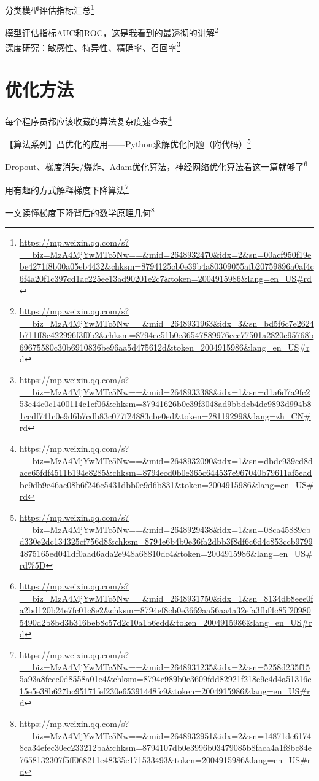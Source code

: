 \documentclass[]{ctexbook}
\renewcommand{\href}[2]{#2\footnote{\url{#1}}}
\begin{document}
\href{https://mp.weixin.qq.com/s?__biz=MzA4MjYwMTc5Nw==\&mid=2648932470\&idx=2\&sn=00acf950f19ebe4271f8b00a05eb4432\&chksm=8794125cb0e39b4a80309055afb20759896a0af4c6f4a20f1c397cd1ac225ee13ad90201e2c7\&token=2004915986\&lang=en_US\#rd}{分类模型评估指标汇总}

\href{https://mp.weixin.qq.com/s?__biz=MzA4MjYwMTc5Nw==\&mid=2648931963\&idx=3\&sn=bd5f6c7e2624b711ff8c422996f3f0b2\&chksm=8794ec51b0e36547889976ccc77501a2820c95768b69675580c30b6910836be96aa5d475612d\&token=2004915986\&lang=en_US\#rd}{模型评估指标AUC和ROC，这是我看到的最透彻的讲解}\\
\href{https://mp.weixin.qq.com/s?__biz=MzA4MjYwMTc5Nw==\&mid=2648933388\&idx=1\&sn=d1a6d7a9fc253e44c0c1400114c1cf06\&chksm=87941626b0e39f3048ad9bbdcb4dc9893d994b81ccdf741c0e9d6b7cdb83c077f24883cbe0ed\&token=281192998\&lang=zh_CN\#rd}{深度研究：敏感性、特异性、精确率、召回率}

\hypertarget{ux4f18ux5316ux65b9ux6cd5}{%
\section{优化方法}\label{ux4f18ux5316ux65b9ux6cd5}}

\href{https://mp.weixin.qq.com/s?__biz=MzA4MjYwMTc5Nw==\&mid=2648932090\&idx=1\&sn=dbdc939cd8dace65fdf4511b194e8285\&chksm=8794ecd0b0e365c644537e967040b79611af5eadbc9db9e46ac08b6f246c5431dbb0e9d6b831\&token=2004915986\&lang=en_US\#rd}{每个程序员都应该收藏的算法复杂度速查表}

\href{https://mp.weixin.qq.com/s?__biz=MzA4MjYwMTc5Nw==\&mid=2648929438\&idx=1\&sn=08ca45889cbd330e2dc134325cf756d8\&chksm=8794e6b4b0e36fa2dbb3f8df6c6d4c853ccb97994875165ed041df0aad6ada2e948a68810dc4\&token=2004915986\&lang=en_US\#rd\%5D}{【算法系列】凸优化的应用------Python求解优化问题（附代码）}

\href{https://mp.weixin.qq.com/s?__biz=MzA4MjYwMTc5Nw==\&mid=2648931750\&idx=1\&sn=8134db8eee0fa2bd120b24e7fc01c8e2\&chksm=8794ef8cb0e3669aa56aa4a32efa3fbf4c85f209805490d2b8bd3b316beb8c57d2c10a1b6edd\&token=2004915986\&lang=en_US\#rd}{Dropout、梯度消失/爆炸、Adam优化算法，神经网络优化算法看这一篇就够了}

\href{https://mp.weixin.qq.com/s?__biz=MzA4MjYwMTc5Nw==\&mid=2648931235\&idx=2\&sn=5258d235f155a93a8fecc0d8558a01e4\&chksm=8794e989b0e3609fdd82921f218e9c4d4a51316c15e5e38b627bc95171fef230e65391448fc9\&token=2004915986\&lang=en_US\#rd}{用有趣的方式解释梯度下降算法}

\href{https://mp.weixin.qq.com/s?__biz=MzA4MjYwMTc5Nw==\&mid=2648932951\&idx=2\&sn=14871de61748ca34efec30ec233212ba\&chksm=8794107db0e3996b03479085b8faca4a1f8bc84e7658132307f5ff068211e48335e171533493\&token=2004915986\&lang=en_US\#rd}{一文读懂梯度下降背后的数学原理几何}
\end{document}
